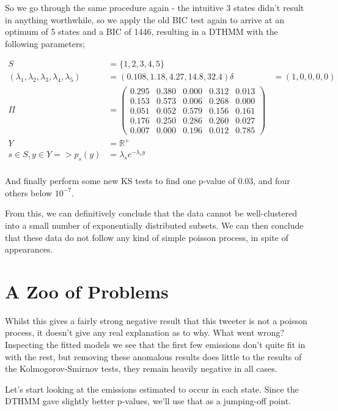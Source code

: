 So we go through the same procedure again - the intuitive 3 states didn't result in anything worthwhile, so we apply the old BIC test again to arrive at an optimum of 5 states and a BIC of 1446, resulting in a DTHMM with the following parameters;

\begin{align*}
S &= \{1,2,3,4,5\}\\
(\lambda_1,\lambda_2,\lambda_3,\lambda_4,\lambda_5) &= (0.108, 1.18, 4.27, 14.8, 32.4)
\delta &= (1,0,0,0,0)\\
\Pi &= 
\left(
    \begin{matrix}
    0.295 & 0.380 & 0.000 & 0.312 & 0.013 \\
    0.153 & 0.573 & 0.006 & 0.268 & 0.000 \\
    0.051 & 0.052 & 0.579 & 0.156 & 0.161 \\
    0.176 & 0.250 & 0.286 & 0.260 & 0.027 \\
    0.007 & 0.000 & 0.196 & 0.012 & 0.785
    \end{matrix}
\right)\\
Y &= \mathbb{R}^{+}\\
s \in S, y \in Y => p_s(y) &= \lambda_s e^{-\lambda_sy}\\
\end{align*}


And finally perform some new KS tests to find one p-value of 0.03, and four others below $10^{-7}$.

From this, we can definitively conclude that the data cannot be well-clustered into a small number of exponentially distributed subsets. We can then conclude that these data do not follow any kind of simple poisson process, in spite of appearances.

\section{A Zoo of Problems}

Whilst this gives a fairly strong negative result that this tweeter is not a poisson process, it doesn't give any real explanation as to why. What went wrong? Inspecting the fitted models we see that the first few emissions don't quite fit in with the rest, but removing these anomalous results does little to the results of the Kolmogorov-Smirnov tests, they remain heavily negative in all cases.

Let's start looking at the emissions estimated to occur in each state. Since the DTHMM gave slightly better p-values, we'll use that as a jumping-off point.

